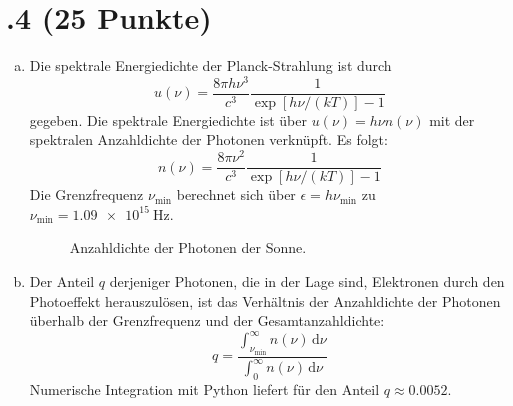 \section*{\nr.4 \titfour (25 Punkte)}
\begin{enumerate}[(a)]
\item Die spektrale Energiedichte der Planck-Strahlung ist durch
\begin{equation}
u(\nu)  = \frac{8\pi h\nu^3}{c^3}\frac{1}{\exp\left[h\nu/( k T)\right]-1 }
\end{equation}
gegeben. Die spektrale Energiedichte ist über $u(\nu) = h \nu n(\nu)$ mit der spektralen Anzahldichte der Photonen verknüpft. Es folgt:
\begin{equation}
n(\nu)  = \frac{8\pi\nu^2}{c^3}\frac{1}{\exp\left[h\nu/( k T)\right]-1 }
\end{equation}
Die Grenzfrequenz $\nu_\text{min}$ berechnet sich über $\epsilon= h\nu_\text{min}$ zu $\nu_\text{min} = \SI{1.09e15}{\hertz}$.
\begin{figure}[htbp]
\centering

\caption{Anzahldichte der Photonen der Sonne.}
\label{fig:anzahldichte}
\end{figure}
\item Der Anteil $q$ derjeniger Photonen, die in der Lage sind, Elektronen durch den Photoeffekt herauszulösen, ist das Verhältnis der Anzahldichte der Photonen überhalb der Grenzfrequenz und der Gesamtanzahldichte:
\begin{equation}
q = \frac{\int_{\nu_\text{min}}^{\infty} n(\nu) \, \mathrm{d}\nu}{\int_{0}^{\infty} n(\nu) \, \mathrm{d}\nu}
\end{equation}
Numerische Integration mit Python liefert für den Anteil $q\approx \num{0.0052}$.
\end{enumerate}